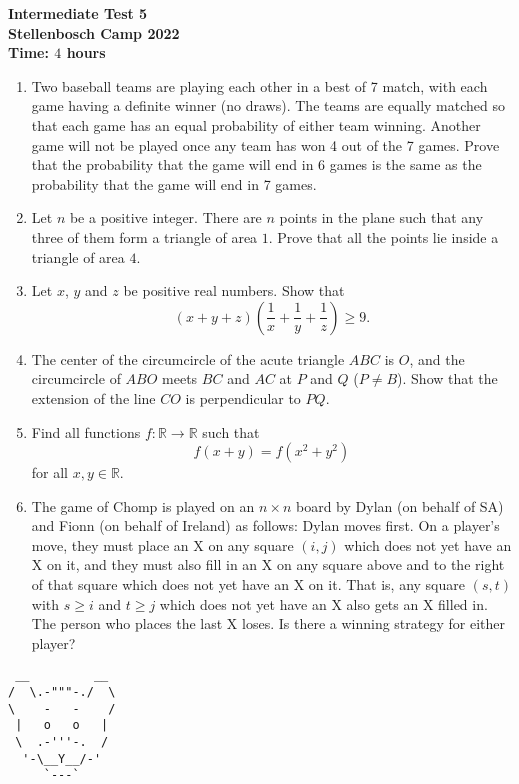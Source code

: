 \documentclass{article}
\begin{document}
\thispagestyle{empty}

\begin{center}
  \textbf{\Large Intermediate Test 5}
  \\ \vspace{1em}
  \textbf{\large Stellenbosch Camp 2022}
  \\ \vspace{1em}
  \textbf{\large Time: $4$ hours}
\end{center}

\bigskip

\begin{enumerate}[itemsep=\fill]

\item %
Two baseball teams are playing each other in a best of 7 match, with each game having a definite winner (no draws). The teams are equally matched so that each game has an equal probability of either team winning. Another game will not be played once any team has won 4 out of the 7 games. Prove that the probability that the game will end in 6 games is the same as the probability that the game will end in 7 games.

 
\item %
Let $n$ be a positive integer. There are $n$ points in the plane such that any three of them form a triangle of area $1$. Prove that all the points lie inside a triangle of area $4$. 


\item %
Let $x$, $y$ and $z$ be positive real numbers. Show that 
$$ (x+y+z)\left(\frac{1}{x}+\frac{1}{y}+\frac{1}{z}\right) \geq 9. $$

\vspace{-12pt}


\item %
The center of the circumcircle of the acute triangle $ABC$ is $O$, and the circumcircle of $ABO$ meets $BC$ and $AC$ at $P$ and $Q$ ($P\neq B$).
Show that the extension of the line $CO$ is perpendicular to $PQ$.


\item %
Find all functions $f : \mathbb{R} \to \mathbb{R}$ such that \[ f(x+y) = f(x^2+y^2) \] for all $x,y \in \mathbb{R}$.


\item %
The game of Chomp is played on an $n \times n$ board by Dylan (on behalf of SA) and Fionn (on behalf of Ireland) as follows: Dylan moves first.
On a player's move, they must place an X on any square $(i, j)$ which does not yet have an X on it, and they must also fill in an X on any square above and to the right of that square which does not yet have an X on it.
That is, any square $(s, t)$ with $s \geq i$ and $t \geq j$ which does not yet have an X also gets an X filled in.
The person who places the last X loses.
Is there a winning strategy for either player?

\end{enumerate}


\vfill
\centering
\small
\begin{BVerbatim}
 __         __
/  \.-"""-./  \
\    -   -    /
 |   o   o   |
 \  .-'''-.  /
  '-\__Y__/-'
     `---`
\end{BVerbatim}
\end{document}
